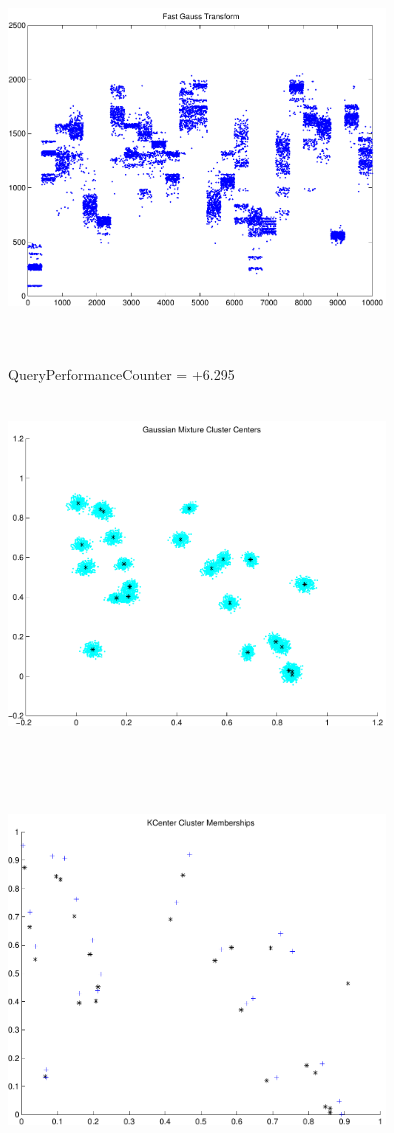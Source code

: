 \documentclass[9pt]{article}
\theoremstyle{plain}
\theoremstyle{definition}
\theoremstyle{remark}
\numberwithin{equation}{section}
\begin{document}
\includegraphics[width=10.0cm,height=10.0cm]{FGT25_Centers.pdf}

QueryPerformanceCounter  =  +6.295
\includegraphics[width=10.0cm,height=10.0cm]{GaussianMixture_ClusterCenters24_Centers.pdf}

\includegraphics[width=10.0cm,height=10.0cm]{KCenterClusterMemberships_24_Centers.pdf}
\end{document}
